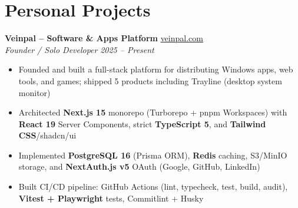 \documentclass[10pt,a4paper]{article}
\begin{document}
\section*{Personal Projects}
\vspace{2pt}
{\small
\textbf{Veinpal -- Software \& Apps Platform} \hfill \href{https://veinpal.com}{veinpal.com}\\[1pt]
\textit{Founder / Solo Developer} \hfill \textit{2025 -- Present}
\begin{itemize}[leftmargin=12pt,itemsep=2pt,topsep=3pt,parsep=0pt]
  \item Founded and built a full-stack platform for distributing Windows apps, web tools, and games; shipped 5 products including Trayline (desktop system monitor)
  \item Architected \textbf{Next.js 15} monorepo (Turborepo + pnpm Workspaces) with \textbf{React 19} Server Components, strict \textbf{TypeScript 5}, and \textbf{Tailwind CSS}/shadcn/ui
  \item Implemented \textbf{PostgreSQL 16} (Prisma ORM), \textbf{Redis} caching, S3/MinIO storage, and \textbf{NextAuth.js v5} OAuth (Google, GitHub, LinkedIn)
  \item Built CI/CD pipeline: GitHub Actions (lint, typecheck, test, build, audit), \textbf{Vitest + Playwright} tests, Commitlint + Husky
\end{itemize}
}
\end{document}
